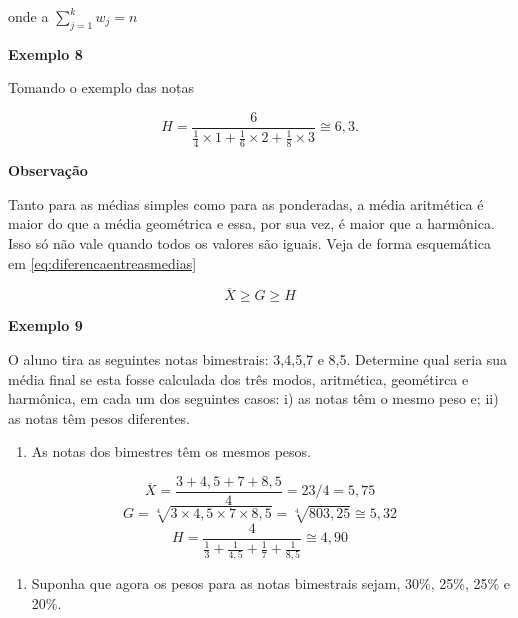 \documentclass[
]{book}
\providecommand{\tightlist}{%
  \setlength{\itemsep}{0pt}\setlength{\parskip}{0pt}}
\begin{document}
onde a \(\sum_{j=1}^{k} w_j = n\)

\textbf{Exemplo 8}

Tomando o exemplo das notas

\begin{equation*}
    H = \frac{6}{\frac{1}{4}\times 1 + \frac{1}{6}\times 2 + \frac{1}{8}\times 3}\cong 6,3.
\end{equation*}

\textbf{Observação}

Tanto para as médias simples como para as ponderadas, a
média aritmética é maior do que a média geométrica e essa, por sua vez, é maior
que a harmônica. Isso só não vale quando todos os valores são iguais. Veja de forma esquemática em \eqref{eq:diferencaentreasmedias}

\begin{equation}
  \overline{X} \geq G \geq H
  \label{eq:diferencaentreasmedias}
\end{equation}

\textbf{Exemplo 9}

O aluno tira as seguintes notas bimestrais: 3,4,5,7 e 8,5. Determine qual seria sua média final se esta fosse calculada dos três modos, aritmética, geométirca e harmônica, em cada um dos seguintes casos: i) as notas têm o mesmo peso e; ii) as notas têm pesos diferentes.

\begin{enumerate}
\def\labelenumi{\roman{enumi})}
\tightlist
\item
  As notas dos bimestres têm os mesmos pesos.
\end{enumerate}

\begin{equation*}
    \overline{X} = \frac{3 + 4,5 + 7 + 8,5}{4} = 23/4 = 5,75
  \end{equation*}
\begin{equation*}
    G = \sqrt[4]{3 \times 4,5 \times 7 \times 8,5} = \sqrt[4]{803,25} \cong 5,32
  \end{equation*}
\begin{equation*}
    H = \frac{4}{\frac{1}{3} +\frac{1}{4,5} +\frac{1}{7} +\frac{1}{8,5}}   \cong 4,90
  \end{equation*}

\begin{enumerate}
\def\labelenumi{\roman{enumi})}
\setcounter{enumi}{1}
\tightlist
\item
  Suponha que agora os pesos para as notas bimestrais sejam, 30\%, 25\%, 25\% e 20\%.
\end{enumerate}
\end{document}
